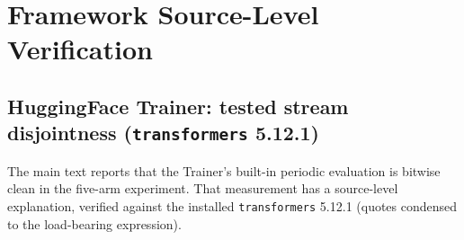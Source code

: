 \documentclass[10pt,letterpaper]{article}
\theoremstyle{remark}
\newcommand{\code}[1]{\texttt{#1}}
\begin{document}
\section{Framework Source-Level Verification}
\label{sec:framework}

\subsection{HuggingFace Trainer: tested stream disjointness
(\code{transformers} 5.12.1)}

The main text reports that the Trainer's built-in periodic evaluation is
bitwise clean in the five-arm experiment. That measurement has a
source-level explanation, verified against the installed
\code{transformers} 5.12.1 (quotes condensed to the load-bearing
expression).
\end{document}
